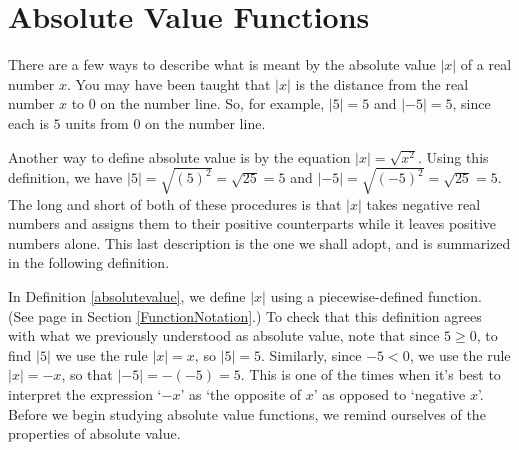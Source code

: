 \section{Absolute Value Functions}
\label{AbsoluteValueFunctions}

There are a few ways to describe what is meant by the absolute value $|x|$ of a real number $x$.  You may have been taught that $|x|$ is the distance from the real number $x$ to $0$ on the number line.  So, for example, $|5| = 5$ and $|-5| = 5$, since each is $5$ units from $0$ on the number line.

\begin{center}


\end{center}

Another way to define absolute value is by the equation $|x| = \sqrt{x^2}$. Using this definition, we have $|5| = \sqrt{(5)^2} = \sqrt{25} = 5$ and $|-5| = \sqrt{(-5)^2} = \sqrt{25} = 5$.  The long and short of both of these procedures is that $|x|$ takes negative real numbers and assigns them to their positive counterparts while it leaves positive numbers alone.  This last description is the one we shall adopt, and is summarized in the following definition.

\smallskip


\smallskip

In Definition \ref{absolutevalue}, we define $|x|$ using a piecewise-defined function.  (See page \pageref{piecewisefunction} in Section \ref{FunctionNotation}.)  To check that this definition agrees with what we previously understood as absolute value, note that since $5 \geq 0$, to find $|5|$ we use the rule $|x| = x$, so $|5|=5$.  Similarly, since $-5 < 0$, we use the rule $|x| = -x$, so that $|-5| = -(-5) = 5$.  This is one of the times when it's best to interpret the expression `$-x$' as `the opposite of $x$' as opposed to `negative $x$'.  Before we begin studying absolute value functions, we remind ourselves of the properties of absolute value.

